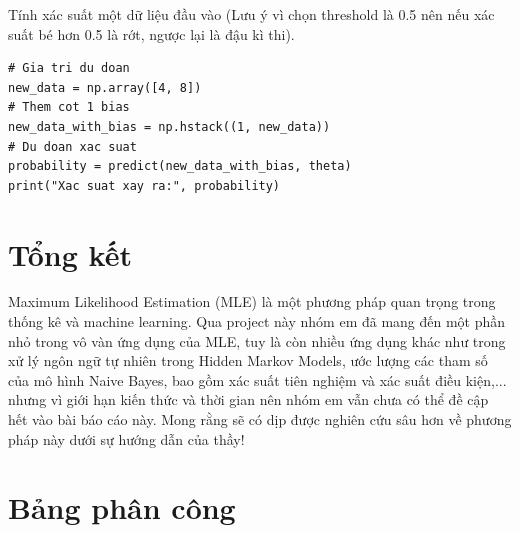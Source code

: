 \documentclass[12pt]{article}
\begin{document}
{{\noindent Tính xác suất một dữ liệu đầu vào (Lưu ý vì chọn threshold là 0.5 nên nếu xác suất bé hơn 0.5 là rớt, ngược lại là đậu kì thi).
\begin{lstlisting}
# Gia tri du doan
new_data = np.array([4, 8])
# Them cot 1 bias
new_data_with_bias = np.hstack((1, new_data))
# Du doan xac suat
probability = predict(new_data_with_bias, theta)
print("Xac suat xay ra:", probability)
\end{lstlisting}
\newpage
\section{Tổng kết}
\fontsize{13}{16}\selectfont
\setlength{\parskip}{0.3cm}
\noindent Maximum Likelihood Estimation (MLE) là một phương pháp quan trọng trong thống kê và machine learning. Qua project này nhóm em đã mang đến một phần nhỏ trong vô vàn ứng dụng của MLE, tuy là còn nhiều ứng dụng khác như trong xử lý ngôn ngữ tự nhiên trong Hidden Markov Models, ước lượng các tham số của mô hình Naive Bayes, bao gồm xác suất tiên nghiệm và xác suất điều kiện,... nhưng vì giới hạn kiến thức và thời gian nên nhóm em vẫn chưa có thể đề cập hết vào bài báo cáo này. Mong rằng sẽ có dịp được nghiên cứu sâu hơn về phương pháp này dưới sự hướng dẫn của thầy!

\section{Bảng phân công}

}}
\end{document}
